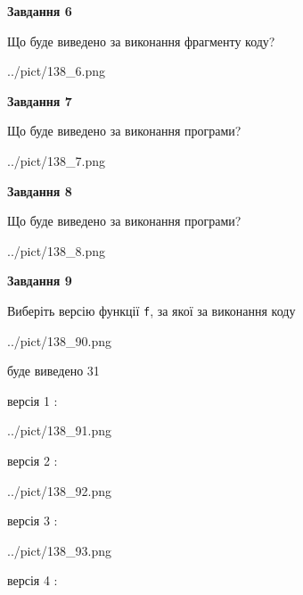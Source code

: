 \documentclass[12pt, ukrainian]{article}
\def\code#1{\Verb!#1!}
\begin{document}
{\begin {large}
{\begin {center}\textbf{Завдання 6}\end {center}}

Що буде виведено за виконання фрагменту коду?\par
\begin{center}
	{../pict/138_6.png}
\end{center}
\newpage

{\begin {center}\textbf{Завдання 7}\end {center}}

Що буде виведено за виконання програми?\par
\begin{center}
	{../pict/138_7.png}
\end{center}
\newpage

{\begin {center}\textbf{Завдання 8}\end {center}}

Що буде виведено за виконання програми?\par
\begin{center}
	{../pict/138_8.png}
\end{center}
\newpage

{\begin {center}\textbf{Завдання 9}\end {center}}

Виберіть версію функції \code{f}, за якої за виконання коду
\begin{center}
	{../pict/138_90.png}
\end{center}
буде виведено 31

\vspace{5mm}
версія 1 :

\begin{center}
	{../pict/138_91.png}
\end{center}
версія 2 :

\begin{center}
	{../pict/138_92.png}
\end{center}
версія 3 :

\begin{center}
	{../pict/138_93.png}
\end{center}
версія 4 :


\end{large}}
\end{document}
